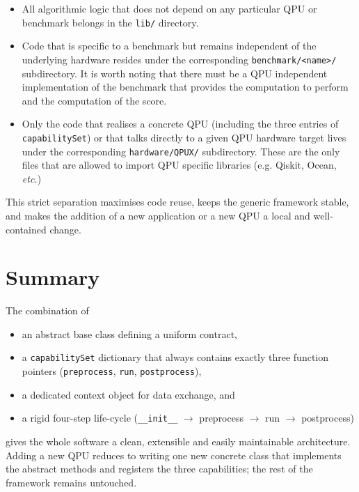 \begin{itemize}
  \item All algorithmic logic that does not depend on any particular QPU  
        or benchmark belongs in the \texttt{lib/} directory.
  \item Code that is specific to a benchmark but remains independent of the  
        underlying hardware resides under the corresponding  
        \texttt{benchmark/<name>/} subdirectory. 
        It is worth noting that there must be a QPU independent implementation of the benchmark that provides the computation to perform and the computation of the score.
  \item Only the code that realises a concrete QPU (including the three  
        entries of \texttt{capabilitySet}) or that talks directly to a given  
        QPU hardware target lives under the corresponding  
        \texttt{hardware/QPUX/} subdirectory.
        These are the only files that are allowed to import QPU specific libraries (e.g. Qiskit, Ocean, \emph{etc.})
\end{itemize}

This strict separation maximises code reuse, keeps the generic framework stable,  
and makes the addition of a new application or a new QPU a local and  
well-contained change.
\section{Summary}

The combination of

\begin{itemize}
  \item an abstract base class defining a uniform contract,
  \item a \texttt{capabilitySet} dictionary that always contains exactly three function pointers  
        (\texttt{preprocess}, \texttt{run}, \texttt{postprocess}),
  \item a dedicated context object for data exchange, and
  \item a rigid four-step life-cycle  
        (\texttt{\_\_init\_\_} $\to$ preprocess $\to$ run $\to$ postprocess)
\end{itemize}

gives the whole software a clean, extensible and easily maintainable architecture.  Adding a new QPU reduces to writing one new concrete class that implements the abstract methods and registers the three capabilities; the rest of the framework remains untouched.

